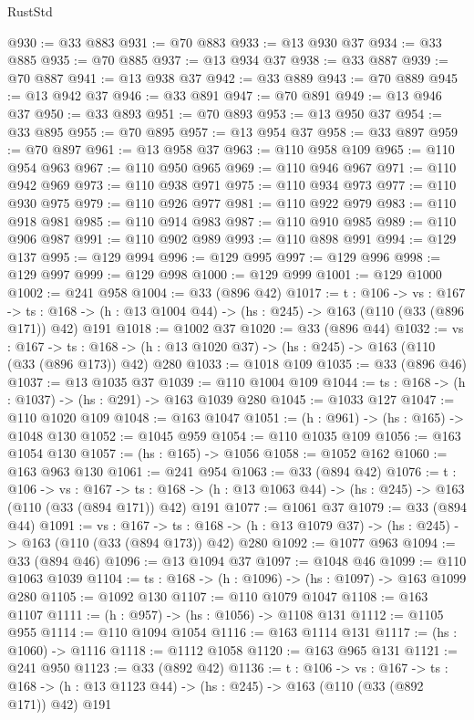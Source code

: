 \begin{lexlean}{RustStd}
\begin{coremodule}
@930 := @33 @883
@931 := @70 @883
@933 := @13 @930 @37
@934 := @33 @885
@935 := @70 @885
@937 := @13 @934 @37
@938 := @33 @887
@939 := @70 @887
@941 := @13 @938 @37
@942 := @33 @889
@943 := @70 @889
@945 := @13 @942 @37
@946 := @33 @891
@947 := @70 @891
@949 := @13 @946 @37
@950 := @33 @893
@951 := @70 @893
@953 := @13 @950 @37
@954 := @33 @895
@955 := @70 @895
@957 := @13 @954 @37
@958 := @33 @897
@959 := @70 @897
@961 := @13 @958 @37
@963 := @110 @958 @109
@965 := @110 @954 @963
@967 := @110 @950 @965
@969 := @110 @946 @967
@971 := @110 @942 @969
@973 := @110 @938 @971
@975 := @110 @934 @973
@977 := @110 @930 @975
@979 := @110 @926 @977
@981 := @110 @922 @979
@983 := @110 @918 @981
@985 := @110 @914 @983
@987 := @110 @910 @985
@989 := @110 @906 @987
@991 := @110 @902 @989
@993 := @110 @898 @991
@994 := @129 @137
@995 := @129 @994
@996 := @129 @995
@997 := @129 @996
@998 := @129 @997
@999 := @129 @998
@1000 := @129 @999
@1001 := @129 @1000
@1002 := @241 @958
@1004 := @33 (@896 @42)
@1017 := {t : @106} ->
  {vs : @167} ->
  {ts : @168} -> (h : @13 @1004 @44) -> (hs : @245) -> @163 (@110 (@33 (@896 @171)) @42) @191
@1018 := @1002 @37
@1020 := @33 (@896 @44)
@1032 := {vs : @167} ->
  {ts : @168} -> (h : @13 @1020 @37) -> (hs : @245) -> @163 (@110 (@33 (@896 @173)) @42) @280
@1033 := @1018 @109
@1035 := @33 (@896 @46)
@1037 := @13 @1035 @37
@1039 := @110 @1004 @109
@1044 := {ts : @168} -> (h : @1037) -> (hs : @291) -> @163 @1039 @280
@1045 := @1033 @127
@1047 := @110 @1020 @109
@1048 := @163 @1047
@1051 := (h : @961) -> (hs : @165) -> @1048 @130
@1052 := @1045 @959
@1054 := @110 @1035 @109
@1056 := @163 @1054 @130
@1057 := (hs : @165) -> @1056
@1058 := @1052 @162
@1060 := @163 @963 @130
@1061 := @241 @954
@1063 := @33 (@894 @42)
@1076 := {t : @106} ->
  {vs : @167} ->
  {ts : @168} -> (h : @13 @1063 @44) -> (hs : @245) -> @163 (@110 (@33 (@894 @171)) @42) @191
@1077 := @1061 @37
@1079 := @33 (@894 @44)
@1091 := {vs : @167} ->
  {ts : @168} -> (h : @13 @1079 @37) -> (hs : @245) -> @163 (@110 (@33 (@894 @173)) @42) @280
@1092 := @1077 @963
@1094 := @33 (@894 @46)
@1096 := @13 @1094 @37
@1097 := @1048 @46
@1099 := @110 @1063 @1039
@1104 := {ts : @168} -> (h : @1096) -> (hs : @1097) -> @163 @1099 @280
@1105 := @1092 @130
@1107 := @110 @1079 @1047
@1108 := @163 @1107
@1111 := (h : @957) -> (hs : @1056) -> @1108 @131
@1112 := @1105 @955
@1114 := @110 @1094 @1054
@1116 := @163 @1114 @131
@1117 := (hs : @1060) -> @1116
@1118 := @1112 @1058
@1120 := @163 @965 @131
@1121 := @241 @950
@1123 := @33 (@892 @42)
@1136 := {t : @106} ->
  {vs : @167} ->
  {ts : @168} -> (h : @13 @1123 @44) -> (hs : @245) -> @163 (@110 (@33 (@892 @171)) @42) @191

\end{coremodule}
\end{lexlean}
